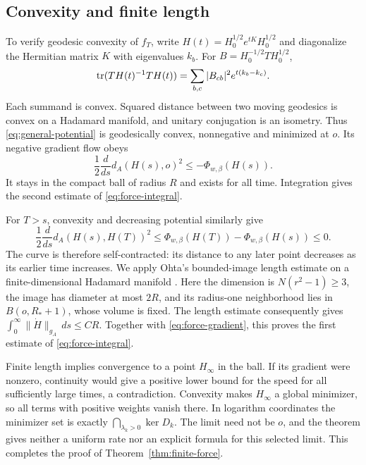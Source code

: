 \subsection{Convexity and finite length}
To verify geodesic convexity of $f_T$, write
$H(t)=H_0^{1/2}e^{tK}H_0^{1/2}$ and diagonalize the Hermitian matrix
$K$ with eigenvalues $k_b$. For $B=H_0^{-1/2}TH_0^{1/2}$,
\[
 \operatorname{tr}(TH(t)^{-1}TH(t))
       =\sum_{b,c}|B_{cb}|^2 e^{t(k_b-k_c)}.
\]
Each summand is convex. Squared distance between two moving geodesics
is convex on a Hadamard manifold, and unitary conjugation is an
isometry. Thus \eqref{eq:general-potential} is geodesically convex,
nonnegative and minimized at $o$. Its negative gradient flow obeys
\begin{equation}\label{eq:finite-energy}
 \frac12\frac{d}{ds}d_A(H(s),o)^2\le-\Phi_{w,\beta}(H(s)).
\end{equation}
It stays in the compact ball of radius $R$ and exists for all time.
Integration gives the second estimate of \eqref{eq:force-integral}.

For $T>s$, convexity and decreasing potential similarly give
\[
 \frac12\frac{d}{ds}d_A(H(s),H(T))^2
       \le\Phi_{w,\beta}(H(T))-\Phi_{w,\beta}(H(s))\le0.
\]
The curve is therefore self-contracted: its distance to any later
point decreases as its earlier time increases. We apply Ohta's
bounded-image length estimate on a finite-dimensional Hadamard
manifold \cite[Theorem~3.3 and (3.8)]{ohta}. Here the dimension is
$N(r^2-1)\ge3$, the image has diameter at most $2R$, and its
radius-one neighborhood lies in $B(o,R_*+1)$, whose volume is fixed.
The length estimate consequently gives
$\int_0^\infty\|\dot H\|_{g_A}\,ds\le CR$.
Together with \eqref{eq:force-gradient}, this proves the first
estimate of \eqref{eq:force-integral}.

Finite length implies convergence to a point $H_\infty$ in the ball.
If its gradient were nonzero, continuity would give a positive lower
bound for the speed for all sufficiently large times, a contradiction.
Convexity makes $H_\infty$ a global minimizer, so all terms with
positive weights vanish there. In logarithm coordinates the minimizer
set is exactly $\bigcap_{\lambda_k>0}\ker D_k$. The limit need
not be $o$, and the theorem gives neither a uniform rate nor an
explicit formula for this selected limit. This completes the proof
of Theorem~\ref{thm:finite-force}.

